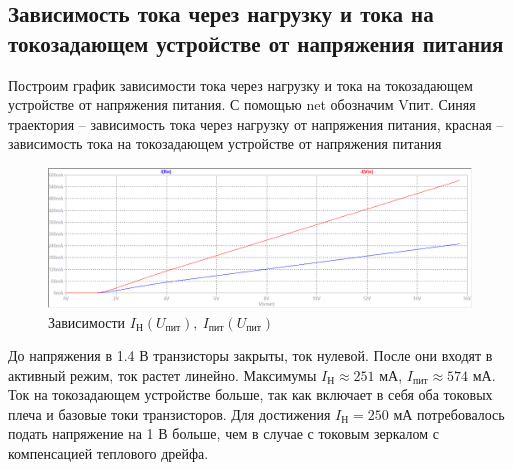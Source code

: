 \documentclass[a4paper, 12pt]{article}
\begin{document}
    \subsection{Зависимость тока через нагрузку и тока на токозадающем устройстве от напряжения питания}
    Построим график зависимости тока через нагрузку и тока на токозадающем устройстве от напряжения питания.
    С помощью net обозначим Vпит. Синяя траектория -- зависимость тока через нагрузку от напряжения питания,
    красная -- зависимость тока на токозадающем устройстве от напряжения питания
    \begin{figure}[H]
        \centering
        \includegraphics[scale=0.46]{2task_Iн(Vпит)_Iпит(Vпит).png}
        \captionsetup{skip=0pt}
        \caption{Зависимости $I_\text{Н}\left( U_\text{пит} \right),\ I_\text{пит}\left( U_\text{пит} \right)$}
        \label{fig:2task_InVl_IlVl}
    \end{figure}
    \noindent До напряжения в 1.4 В транзисторы закрыты, ток нулевой. После они входят в активный режим,
    ток растет линейно. Максимумы $I_\text{Н}\approx251$ мА, $I_\text{пит}\approx574$ мА. Ток
    на токозадающем устройстве больше, так как включает в себя оба токовых плеча и базовые токи транзисторов.
    Для достижения $I_\text{Н}=250$ мА потребовалось подать напряжение на 1 В больше, чем в случае
    с токовым зеркалом с компенсацией теплового дрейфа.
\end{document}
